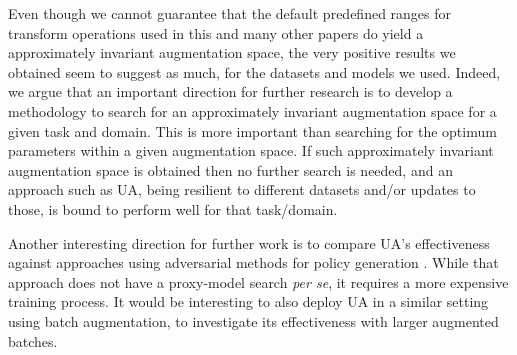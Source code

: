 \documentclass[runningheads]{llncs}
\begin{document}
	Even though we cannot guarantee that the default predefined ranges for transform operations used in this and many other papers do yield a approximately invariant augmentation space, the very positive results we obtained seem to suggest as much, for the datasets and models we used.
	Indeed, we argue that an important direction for further research is to develop a methodology to search for an approximately invariant augmentation space for a given task and domain.  This is more important than searching for the optimum parameters within a given augmentation space. If such approximately invariant augmentation space is obtained then no further search is needed, and an approach such as UA, being resilient to different datasets and/or updates to those, is bound to perform well for that task/domain. 


	Another interesting direction for further work is to compare UA's effectiveness against approaches using adversarial methods for policy generation \cite{zhang2019adversarial}.  While that approach does not have a proxy-model search \emph{per se}, it requires a more expensive training process. It would be interesting to also deploy UA in a similar setting using batch augmentation\cite{hoffer2019augment}, to investigate its effectiveness with larger augmented batches. 
	
\end{document}

